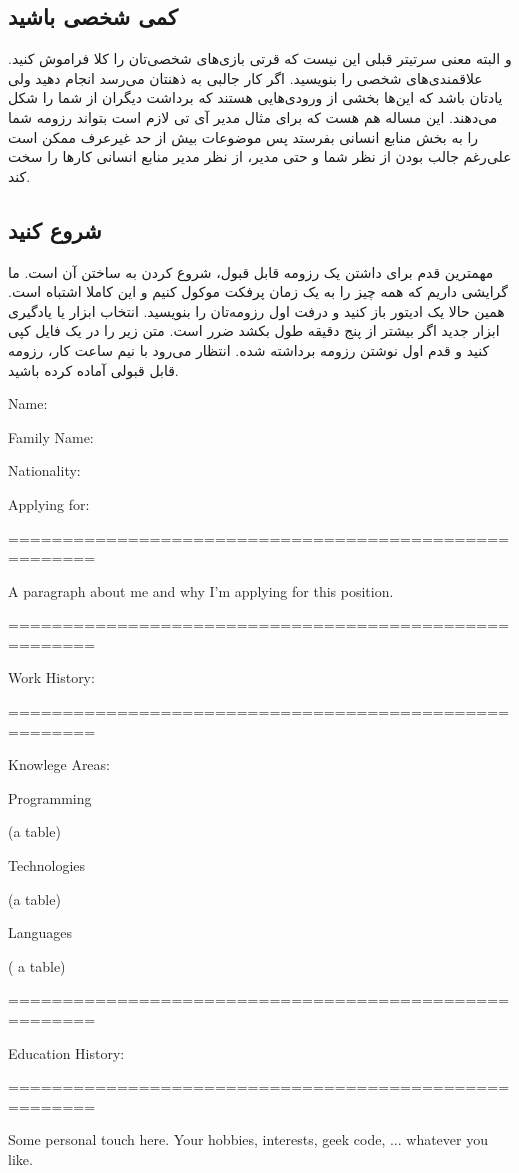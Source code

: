 \subsection*{کمی شخصی باشید}
و البته معنی سرتیتر قبلی این نیست که قرتی بازی‌های شخصی‌تان را کلا فراموش کنید. علاقمندی‌های شخصی را بنویسید. اگر کار جالبی به ذهنتان می‌رسد انجام دهید ولی یادتان باشد که این‌ها بخشی از ورودی‌هایی هستند که برداشت دیگران از شما را شکل می‌دهند. این مساله هم هست که برای مثال مدیر آی تی لازم است بتواند رزومه شما را به بخش منابع انسانی بفرستد پس موضوعات بیش از حد غیرعرف ممکن است علی‌رغم جالب بودن از نظر شما و حتی مدیر، از نظر مدیر منابع انسانی کارها را سخت کند.
\subsection*{شروع کنید}
مهمترین قدم برای داشتن یک رزومه قابل قبول، شروع کردن به ساختن آن است. ما گرایشی داریم که همه چیز را به یک زمان پرفکت موکول کنیم و این کاملا اشتباه است. همین حالا یک ادیتور باز کنید و درفت اول رزومه‌تان را بنویسید. انتخاب ابزار یا یادگیری ابزار جدید اگر بیشتر از پنج دقیقه طول بکشد ضرر است. متن زیر را در یک فایل کپی کنید و قدم اول نوشتن رزومه برداشته شده. انتظار می‌رود با نیم ساعت کار، رزومه قابل قبولی آماده کرده باشید.
\newpage
\begin{latin}
\begin{mybox}
Name:

Family Name:

Nationality:

Applying for:

======================================================

A paragraph about me and why I'm applying for this position.

======================================================

Work History:

======================================================

Knowlege Areas:

Programming

(a table)

Technologies

(a table)

Languages

( a table)

======================================================

Education History:

======================================================

Some personal touch here. Your hobbies, interests, geek code, ... 
whatever you like.

\end{mybox}
\end{latin}
